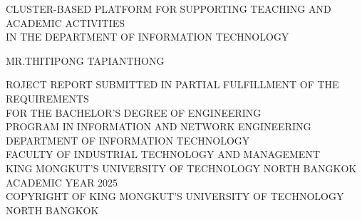 \newpage
\thispagestyle{empty}
\begin{center}

\vspace*{-0.5in}

CLUSTER-BASED PLATFORM FOR SUPPORTING TEACHING AND ACADEMIC ACTIVITIES \\
IN THE DEPARTMENT OF INFORMATION TECHNOLOGY %

\vspace{0.2in}

\vspace{80mm}
MR.THITIPONG TAPIANTHONG      %
\vspace{76.5mm}   



\vspace{0.2in}

ROJECT REPORT SUBMITTED IN PARTIAL FULFILLMENT OF THE REQUIREMENTS \\



FOR THE BACHELOR’S DEGREE OF ENGINEERING\\
PROGRAM IN INFORMATION AND NETWORK ENGINEERING\\

DEPARTMENT OF INFORMATION TECHNOLOGY\\
FACULTY OF INDUSTRIAL TECHNOLOGY AND MANAGEMENT\\
KING MONGKUT’S UNIVERSITY OF TECHNOLOGY NORTH BANGKOK\\
ACADEMIC YEAR 2025\\
COPYRIGHT OF KING MONGKUT’S UNIVERSITY OF TECHNOLOGY NORTH BANGKOK

\end{center}